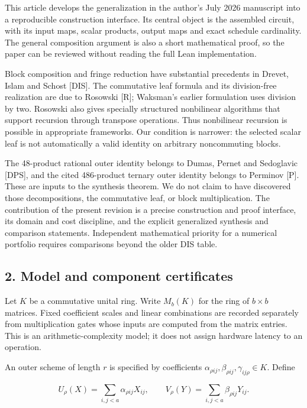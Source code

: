 \documentclass[
  11pt,
]{article}
\begin{document}
This article develops the generalization in the author's July 2026
manuscript into a reproducible construction interface. Its central
object is the assembled circuit, with its input maps, scalar products,
output maps and exact schedule cardinality. The general composition
argument is also a short mathematical proof, so the paper can be
reviewed without reading the full Lean implementation.

Block composition and fringe reduction have substantial precedents in
Drevet, Islam and Schost {[}DIS{]}. The commutative leaf formula and its
division-free realization are due to Rosowski {[}R{]}; Waksman's earlier
formulation uses division by two. Rosowski also gives specially
structured nonbilinear algorithms that support recursion through
transpose operations. Thus nonbilinear recursion is possible in
appropriate frameworks. Our condition is narrower: the selected scalar
leaf is not automatically a valid identity on arbitrary noncommuting
blocks.

The 48-product rational outer identity belongs to Dumas, Pernet and
Sedoglavic {[}DPS{]}, and the cited 486-product ternary outer identity
belongs to Perminov {[}P{]}. These are inputs to the synthesis theorem.
We do not claim to have discovered those decompositions, the commutative
leaf, or block multiplication. The contribution of the present revision
is a precise construction and proof interface, its domain and cost
discipline, and the explicit generalized synthesis and comparison
statements. Independent mathematical priority for a numerical portfolio
requires comparisons beyond the older DIS table.

\subsection{2. Model and component
certificates}\label{model-and-component-certificates}

Let \(K\) be a commutative unital ring. Write \(M_b(K)\) for the ring of
\(b\times b\) matrices. Fixed coefficient scales and linear combinations
are recorded separately from multiplication gates whose inputs are
computed from the matrix entries. This is an arithmetic-complexity
model; it does not assign hardware latency to an operation.

An outer scheme of length \(r\) is specified by coefficients
\(\alpha_{\rho ij},\beta_{\rho ij},\gamma_{ij\rho}\in K\). Define

\[
U_\rho(X)=\sum_{i,j<a}\alpha_{\rho ij}X_{ij},\qquad
V_\rho(Y)=\sum_{i,j<a}\beta_{\rho ij}Y_{ij}.
\]
\end{document}
